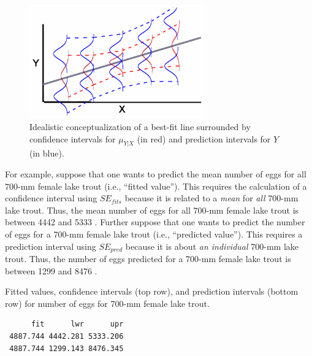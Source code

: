 \documentclass[10pt,openany]{book}\usepackage[]{graphicx}\usepackage[]{color}
\makeatletter
\newenvironment{kframe}{%
 \def\at@end@of@kframe{}%
 \ifinner\ifhmode%
  \def\at@end@of@kframe{\end{minipage}}%
  \begin{minipage}{\columnwidth}%
 \fi\fi%
 \def\FrameCommand##1{\hskip\@totalleftmargin \hskip-\fboxsep
 \colorbox{shadecolor}{##1}\hskip-\fboxsep
     \hskip-\linewidth \hskip-\@totalleftmargin \hskip\columnwidth}%
 \MakeFramed {\advance\hsize-\width
   \@totalleftmargin\z@ \linewidth\hsize
   \@setminipage}}%
 {\par\unskip\endMakeFramed%
 \at@end@of@kframe}
\newenvironment{knitrout}{}{} %
\makeatother
\begin{document}
\begin{figure}[h]
  \centering
  \includegraphics[width=3in]{FigsStatic/SLR_Pred_Bands.jpg}
  \caption{Idealistic conceptualization of a best-fit line surrounded by confidence intervals for $\mu_{Y|X}$ (in red) and prediction intervals for $Y$ (in blue).}\label{fig:SLRPredBands}
\end{figure}




For example, suppose that one wants to predict the mean number of eggs for all 700-mm female lake trout (i.e., ``fitted value'').  This requires the calculation of a confidence interval using $SE_{fits}$ because it is related to a \emph{mean} for \emph{all} 700-mm lake trout.  Thus, the mean number of eggs for all 700-mm female lake trout is between 4442 and 5333 .  Further suppose that one wants to predict the number of eggs for a 700-mm female lake trout (i.e., ``predicted value'').  This requires a prediction interval using $SE_{pred}$ because it is about \emph{an individual} 700-mm lake trout.  Thus, the number of eggs predicted for a 700-mm female lake trout is between 1299 and 8476 .

\begin{table}[h]
  \centering
  \caption{Fitted values, confidence intervals (top row), and prediction intervals (bottom row) for number of eggs for 700-mm female lake trout.}\label{tab:SLRLTPredict}
\begin{knitrout}
\color{fgcolor}\begin{kframe}
\begin{verbatim}
      fit      lwr      upr
 4887.744 4442.281 5333.206
 4887.744 1299.143 8476.345
\end{verbatim}
\end{kframe}
\end{knitrout}
\end{table}
\end{document}
